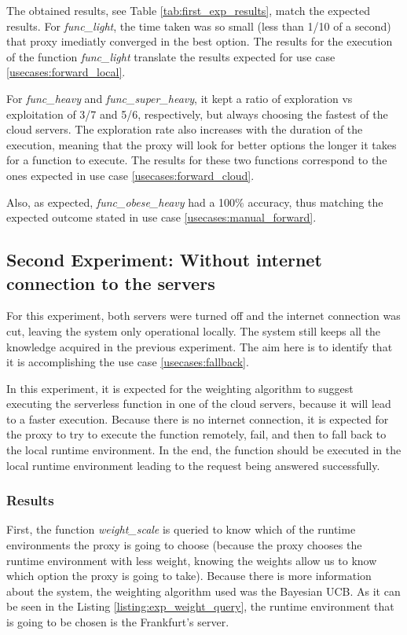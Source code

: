 \documentclass[conference]{IEEEtran}
\begin{document}
The obtained results, see Table \ref{tab:first_exp_results}, match the expected
results. For \textit{func\_light}, the time taken was so small (less than 1/10 of
a second) that proxy imediatly converged in the best option. The results for the
execution of the function \textit{func\_light} translate the results expected for
use case \ref{usecases:forward_local}.

For \textit{func\_heavy} and \textit{func\_super\_heavy}, it kept a ratio of
exploration vs exploitation of 3/7 and 5/6, respectively, but always choosing the
fastest of the cloud servers. The exploration rate also increases with the
duration of the execution, meaning that the proxy will look for better options the
longer it takes for a function to execute. The results for these two functions
correspond to the ones expected in use case \ref{usecases:forward_cloud}.

Also, as expected, \textit{func\_obese\_heavy} had a 100\% accuracy, thus matching
the expected outcome stated in use case \ref{usecases:manual_forward}.

\subsection{Second Experiment: Without internet connection to the servers}
For this experiment, both servers were turned off and the internet connection was
cut, leaving the system only operational locally. The system still keeps all the
knowledge acquired in the previous experiment.
The aim here is to identify that it is accomplishing the use case
\ref{usecases:fallback}.

In this experiment, it is expected for the weighting algorithm to suggest
executing the serverless function in one of the cloud servers, because it will
lead to a faster execution. Because there is no internet connection, it is
expected for the proxy to try to execute the function remotely, fail, and then to
fall back to the local runtime environment. In the end, the function should be
executed in the local runtime environment leading to the request being answered
successfully.

\subsubsection{Results}
First, the function \textit{weight\_scale} is queried to know which of the runtime
environments the proxy is going to choose (because the proxy chooses the runtime environment with less weight, knowing the weights allow us to know which option
the proxy is going to take). Because there is more information about the system,
the weighting algorithm used was the Bayesian UCB. As it can be seen in the Listing
\ref{listing:exp_weight_query}, the runtime environment that is going to be
chosen is the Frankfurt's server.
\end{document}
